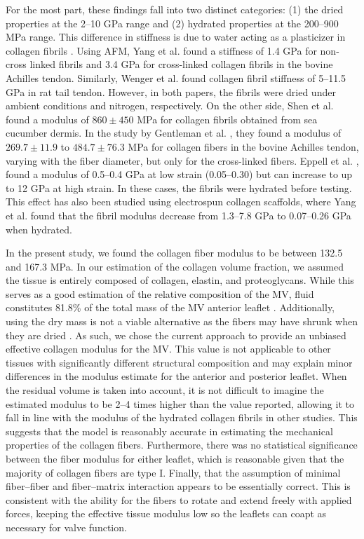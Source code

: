     For the most part, these findings fall into two distinct categories: (1) the dried properties at the 2–10 GPa range and (2) hydrated properties at the 200–900 MPa range. This difference in stiffness is due to water acting as a plasticizer in collagen fibrils \cite{tseretely_dsc_1992}. Using AFM, Yang et al. \cite{yang_micromechanical_2007} found a stiffness of 1.4 GPa for non-cross linked fibrils and 3.4 GPa for cross-linked collagen fibrils in the bovine Achilles tendon. Similarly, Wenger et al. \cite{wenger_mechanical_2007} found collagen fibril stiffness of 5–11.5 GPa in rat tail tendon. However, in both papers, the fibrils were dried under ambient conditions and nitrogen, respectively. On the other side, Shen et al. \cite{shen_stress_2008} found a modulus of $860\pm450$ MPa for collagen fibrils obtained from sea cucumber dermis. In the study by Gentleman et al. \cite{gentleman_mechanical_2003}, they found a modulus of $269.7\pm11.9$ to $484.7\pm76.3$ MPa for collagen fibers in the bovine Achilles tendon, varying with the fiber diameter, but only for the cross-linked fibers. Eppell et al. \cite{eppell_nano_2006}, found a modulus of 0.5–0.4 GPa at low strain (0.05–0.30) but can increase to up to 12 GPa at high strain. In these cases, the fibrils were hydrated before testing. This effect has also been studied using electrospun collagen scaffolds, where Yang et al. found that the fibril modulus decrease from 1.3–7.8 GPa to 0.07–0.26 GPa when hydrated\cite{yang_mechanical_2008}.


    In the present study, we found the collagen fiber modulus to be between 132.5 and 167.3 MPa. In our estimation of the collagen volume fraction, we assumed the tissue is entirely composed of collagen, elastin, and proteoglycans. While this serves as a good estimation of the relative composition of the MV, fluid constitutes 81.8\% of the total mass of the MV anterior leaflet \cite{lis_biochemical_1987}. Additionally, using the dry mass is not a viable alternative as the fibers may have shrunk when they are dried \cite{leikin_raman_1997}. As such, we chose the current approach to provide an unbiased effective collagen modulus for the MV. This value is not applicable to other tissues with significantly different structural composition and may explain minor differences in the modulus estimate for the anterior and posterior leaflet. When the residual volume is taken into account, it is not difficult to imagine the estimated modulus to be 2–4 times higher than the value reported, allowing it to fall in line with the modulus of the hydrated collagen fibrils in other studies. This suggests that the model is reasonably accurate in estimating the mechanical properties of the collagen fibers. Furthermore, there was no statistical significance between the fiber modulus for either leaflet, which is reasonable given that the majority of collagen fibers are type I. Finally, that the assumption of minimal fiber–fiber and fiber–matrix interaction appears to be essentially correct. This is consistent with the ability for the fibers to rotate and extend freely with applied forces, keeping the effective tissue modulus low so the leaflets can coapt as necessary for valve function.
    
